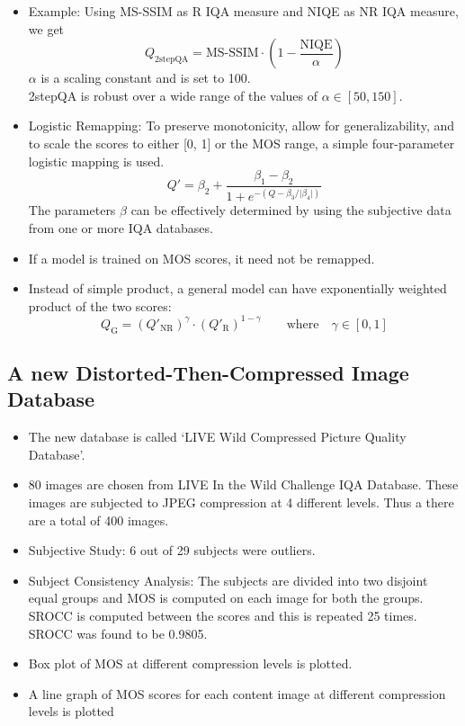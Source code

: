 \documentclass{article}
\begin{document}
\begin{itemize}
\begin{itemize}
        \end{itemize}
        \item Example: Using MS-SSIM as R IQA measure and NIQE as NR IQA measure, we get
        \[ Q_{\textrm{2stepQA}} = \textrm{MS-SSIM} \cdot \left( 1 - \frac{\textrm{NIQE}}{\alpha} \right) \]
        $ \alpha $ is a scaling constant and is set to 100. \\
        2stepQA is robust over a wide range of the values of $\alpha \in [50, 150] $.
        \item Logistic Remapping: To preserve monotonicity, allow for generalizability, and to scale the scores to either [0, 1] or the MOS range, a simple four-parameter logistic mapping is used.
        \[ Q' = \beta_2 + \frac{\beta_1 - \beta_2}{1 + e^{- \left( Q - \beta_3 / \vert \beta_4 \vert \right)}} \]
        The parameters $\beta$ can be effectively determined by using the subjective data from one or more IQA databases.
        \item If a model is trained on MOS scores, it need not be remapped.
        \item Instead of simple product, a general model can have exponentially weighted product of the two scores:
        \[ Q_\textrm{G} = \left(Q'_{\textrm{NR}}\right)^\gamma \cdot \left(Q'_{\textrm{R}}\right)^{1-\gamma} \qquad \textrm{where} \quad \gamma \in [0,1] \]
    \end{itemize}

    \subsection{A new Distorted-Then-Compressed Image Database}\label{subsec:Predicting_the_Quality_of_Images_Compressed_After_Distortion_in_Two_Steps:new-image-database}
    \begin{itemize}
        \item The new database is called `LIVE Wild Compressed Picture Quality Database'.
        \item 80 images are chosen from LIVE In the Wild Challenge IQA Database.
        These images are subjected to JPEG compression at 4 different levels.
        Thus a there are a total of 400 images.
        \item Subjective Study: 6 out of 29 subjects were outliers.
        \item Subject Consistency Analysis: The subjects are divided into two disjoint equal groups and MOS is computed on each image for both the groups.
        SROCC is computed between the scores and this is repeated 25 times.
        SROCC was found to be 0.9805.
        \item Box plot of MOS at different compression levels is plotted.
        \item A line graph of MOS scores for each content image at different compression levels is plotted
    \end{itemize}
\end{document}
